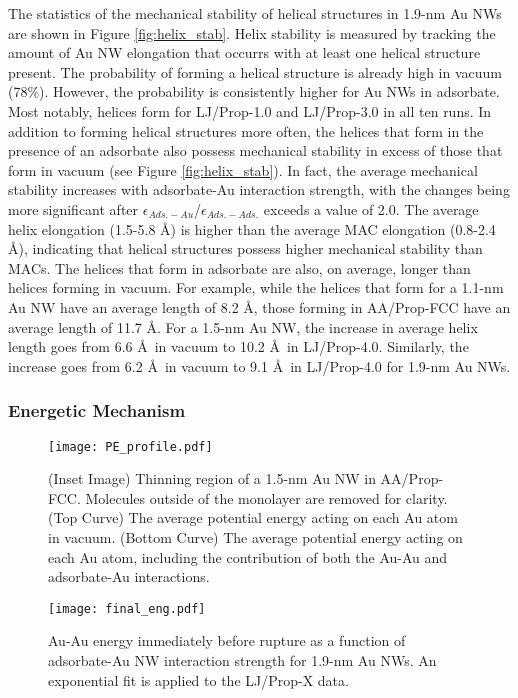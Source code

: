 \documentclass[10pt]{report}  %
\begin{document}
The statistics of the mechanical stability of helical structures in 1.9-nm Au NWs are shown in Figure \ref{fig:helix_stab}.  Helix stability is measured by tracking the amount of Au NW elongation that occurrs with at least one helical structure present.  The probability of forming a helical structure is already high in vacuum (78\%).  However, the probability is consistently higher for Au NWs in adsorbate.  Most notably, helices form for LJ/Prop-1.0 and LJ/Prop-3.0 in all ten runs.  In addition to forming helical structures more often, the helices that form in the presence of an adsorbate also possess mechanical stability in excess of those that form in vacuum (see Figure \ref{fig:helix_stab}).  In fact, the average mechanical stability increases with adsorbate-Au interaction strength, with the changes being more significant after $\epsilon_{Ads.-Au}$/$\epsilon_{Ads.-Ads.}$ exceeds a value of 2.0.  The average helix elongation (1.5-5.8 \AA) is higher than the average MAC elongation (0.8-2.4 \AA), indicating that helical structures possess higher mechanical stability than MACs.  The helices that form in adsorbate are also, on average, longer than helices forming in vacuum.  For example, while the helices that form for a 1.1-nm Au NW have an average length of 8.2 \AA, those forming in AA/Prop-FCC have an average length of 11.7 \AA.  For a 1.5-nm Au NW, the increase in average helix length goes from 6.6 \AA\ in vacuum to 10.2 \AA\ in LJ/Prop-4.0.  Similarly, the increase goes from 6.2 \AA\ in vacuum to 9.1 \AA\ in LJ/Prop-4.0 for 1.9-nm Au NWs.   



\subsubsection{Energetic Mechanism}

%
%
\begin{figure}[]
	\centering
	\texttt{[image: PE\_profile.pdf]}
	\caption{ (Inset Image) Thinning region of a 1.5-nm Au NW in AA/Prop-FCC.  Molecules outside of the monolayer are removed for clarity.  (Top Curve) The average potential energy acting on each Au atom in vacuum.  (Bottom Curve) The average potential energy acting on each Au atom, including the contribution of both the Au-Au and adsorbate-Au interactions. }
	\label{fig:pe_profile}
\end{figure}

%
%
\begin{figure}[]
	\centering
	\texttt{[image: final\_eng.pdf]}
	\caption{Au-Au energy immediately before rupture as a function of adsorbate-Au NW interaction strength for 1.9-nm Au NWs.  An exponential fit is applied to the LJ/Prop-X data.}
	\label{fig:final_eng}
\end{figure}
\end{document}
